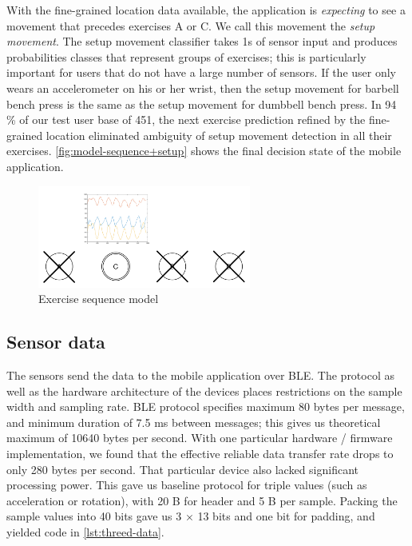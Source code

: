 \documentclass[a4paper, 10 pt, conference]{IEEEtran}
\begin{document}
With the fine-grained location data available, the application is \emph{expecting} to see a movement that precedes exercises A or C. We call this movement the \emph{setup movement}. The setup movement classifier takes 1s of sensor input and produces probabilities classes that represent groups of exercises; this is particularly important for users that do not have a large number of sensors. If the user only wears an accelerometer on his or her wrist, then the setup movement for barbell bench press is the same as the setup movement for dumbbell bench press. In 94 \% of our test user base of 451, the next exercise prediction refined by the fine-grained location eliminated ambiguity of setup movement detection in all their exercises. \autoref{fig:model-sequence+setup} shows the final decision state of the mobile application.

\begin{figure}[hb]
	\begin{center}
		\caption{Exercise sequence model}
		\label{fig:model-sequence+setup}
		\includegraphics[width=7cm,keepaspectratio]{ri-model-sequence+setup.png}
	\end{center}
\end{figure}

\subsection{Sensor data}

The sensors send the data to the mobile application over BLE. The protocol as well as the hardware architecture of the devices places restrictions on the sample width and sampling rate. BLE protocol specifies maximum 80 bytes per message, and minimum duration of 7.5 ms between messages; this gives us theoretical maximum of 10640 bytes per second. With one particular hardware / firmware implementation, we found that the effective reliable data transfer rate drops to only 280 bytes per second. That particular device also lacked significant processing power. This gave us baseline protocol for triple values (such as acceleration or rotation), with 20 B for header and 5 B per sample. Packing the sample values into 40 bits gave us 3 $\times$ 13 bits and one bit for padding, and yielded code in \autoref{lst:threed-data}.
\end{document}
